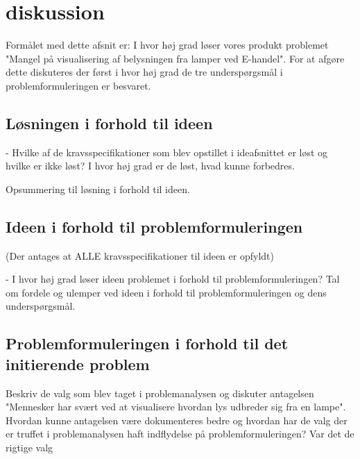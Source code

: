 \section{diskussion}


Formålet med dette afsnit er: I hvor høj grad løser vores produkt problemet "Mangel på visualisering af belysningen fra lamper ved E-handel". For at afgøre dette diskuteres der først i hvor høj grad de tre underspørgsmål i problemformuleringen er besvaret. 

\subsection{Løsningen i forhold til ideen}

 - Hvilke af de kravsspecifikationer som blev opstillet i ideafsnittet er løst og hvilke er ikke løst? I hvor høj grad er de løst, hvad kunne forbedres.

 Opsummering til løsning i forhold til ideen. 

 \subsection{Ideen i forhold til problemformuleringen}

 (Der antages at ALLE kravsspecifikationer til ideen er opfyldt)

 - I hvor høj grad løser ideen problemet i forhold til problemformuleringen? Tal om fordele og ulemper ved ideen i forhold til problemformuleringen og dens underspørgsmål.

 \subsection{Problemformuleringen i forhold til det initierende problem}

 Beskriv de valg som blev taget i problemanalysen og diskuter antagelsen "Mennesker har svært ved at visualisere hvordan lys udbreder sig fra en lampe". Hvordan kunne antagelsen være dokumenteres bedre og hvordan har de valg der er truffet i problemanalysen haft indflydelse på problemformuleringen? Var det de rigtige valg



